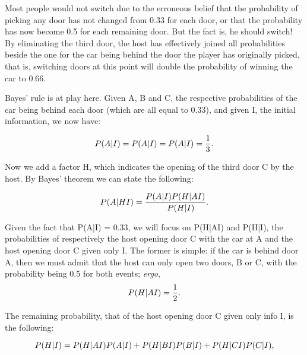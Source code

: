 Most people would not switch due to the erroneous belief that the probability
of picking any door has not changed from 0.33 for each door, or that the
probability has now become 0.5 for each remaining door. But the fact is, he
should switch! By eliminating the third door, the host has effectively joined
all probabilities beside the one for the car being behind the door the player
has originally picked, that is, switching doors at this point will double the
probability of winning the car to 0.66.

Bayes' rule is at play here. Given A, B and C, the respective probabilities of
the car being behind each door (which are all equal to 0.33), and given I, the
initial information, we now have:

\begin{equation}
 \\P(A|I) = \\P(A|I) = \\P(A|I) = \frac{1}{3}.
\end{equation}

Now we add a factor H, which indicates the opening of the third door C by the
host. By Bayes' theorem we can state the following:

\begin{equation}
  \\P(A|HI) = \frac{\\P(A|I) \\P(H|AI)}{\\P(H|I)}.
\end{equation}

Given the fact that P(A|I) = 0.33, we will focus on P(H|AI) and P(H|I), the
probabilities of respectively the host opening door C with the car at A and the
host opening door C given only I. The former is simple: if the car is behind
door A, then we must admit that the host can only open two doors, B or C, with
the probability being 0.5 for both events; \textit{ergo}, 
\begin{equation}
\\P(H|AI) = \frac{1}{2}.
\end{equation}

The remaining probability, that of the host opening door C given only info I, is the following:

\begin{equation}
\\P(H|I) = \\P(H|AI)\\P(A|I) + \\P(H|BI)\\P(B|I) + \\P(H|CI)\\P(C|I),
\end{equation}

